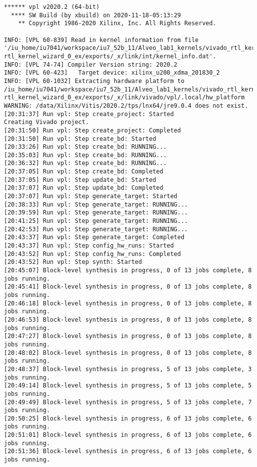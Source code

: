 \begin{lstlisting}[label=code:log_file, caption=Содержимое log-файла, basicstyle=\tiny]
****** vpl v2020.2 (64-bit)
  **** SW Build (by xbuild) on 2020-11-18-05:13:29
    ** Copyright 1986-2020 Xilinx, Inc. All Rights Reserved.

INFO: [VPL 60-839] Read in kernel information from file '/iu_home/iu7041/workspace/iu7_52b_11/Alveo_lab1_kernels/vivado_rtl_kernel/ rtl_kernel_wizard_0_ex/exports/_x/link/int/kernel_info.dat'.
INFO: [VPL 74-74] Compiler Version string: 2020.2
INFO: [VPL 60-423]   Target device: xilinx_u200_xdma_201830_2
INFO: [VPL 60-1032] Extracting hardware platform to /iu_home/iu7041/workspace/iu7_52b_11/Alveo_lab1_kernels/vivado_rtl_kernel/ rtl_kernel_wizard_0_ex/exports/_x/link/vivado/vpl/.local/hw_platform
WARNING: /data/Xilinx/Vitis/2020.2/tps/lnx64/jre9.0.4 does not exist.
[20:31:37] Run vpl: Step create_project: Started
Creating Vivado project.
[20:31:50] Run vpl: Step create_project: Completed
[20:31:50] Run vpl: Step create_bd: Started
[20:33:26] Run vpl: Step create_bd: RUNNING...
[20:35:03] Run vpl: Step create_bd: RUNNING...
[20:36:32] Run vpl: Step create_bd: RUNNING...
[20:37:05] Run vpl: Step create_bd: Completed
[20:37:05] Run vpl: Step update_bd: Started
[20:37:07] Run vpl: Step update_bd: Completed
[20:37:07] Run vpl: Step generate_target: Started
[20:38:33] Run vpl: Step generate_target: RUNNING...
[20:39:59] Run vpl: Step generate_target: RUNNING...
[20:41:25] Run vpl: Step generate_target: RUNNING...
[20:42:53] Run vpl: Step generate_target: RUNNING...
[20:43:37] Run vpl: Step generate_target: Completed
[20:43:37] Run vpl: Step config_hw_runs: Started
[20:43:52] Run vpl: Step config_hw_runs: Completed
[20:43:52] Run vpl: Step synth: Started
[20:45:07] Block-level synthesis in progress, 0 of 13 jobs complete, 8 jobs running.
[20:45:41] Block-level synthesis in progress, 0 of 13 jobs complete, 8 jobs running.
[20:46:18] Block-level synthesis in progress, 0 of 13 jobs complete, 8 jobs running.
[20:46:53] Block-level synthesis in progress, 0 of 13 jobs complete, 8 jobs running.
[20:47:27] Block-level synthesis in progress, 0 of 13 jobs complete, 8 jobs running.
[20:48:02] Block-level synthesis in progress, 0 of 13 jobs complete, 8 jobs running.
[20:48:37] Block-level synthesis in progress, 5 of 13 jobs complete, 3 jobs running.
[20:49:14] Block-level synthesis in progress, 5 of 13 jobs complete, 5 jobs running.
[20:49:49] Block-level synthesis in progress, 5 of 13 jobs complete, 7 jobs running.
[20:50:25] Block-level synthesis in progress, 6 of 13 jobs complete, 6 jobs running.
[20:51:01] Block-level synthesis in progress, 6 of 13 jobs complete, 6 jobs running.
[20:51:36] Block-level synthesis in progress, 6 of 13 jobs complete, 6 jobs running.

\end{lstlisting}
